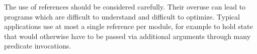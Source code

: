 The use of references should be considered carefully.
Their overuse can lead to programs which are
difficult to understand and difficult to optimize.
Typical applications use at most a single reference per module,
for example to hold state that would otherwise have to be passed
via additional arguments through many predicate invocations.

